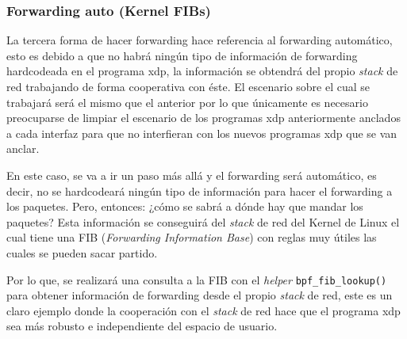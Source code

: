     
    



\subsubsection{Forwarding auto (Kernel FIBs)}

La tercera forma de hacer forwarding hace referencia al forwarding automático, esto es debido a que no habrá ningún tipo de información de forwarding hardcodeada en el programa \gls{xdp}, la información se obtendrá del propio \textit{stack} de red trabajando de forma cooperativa con éste. El escenario sobre el cual se trabajará será el mismo que el anterior por lo que únicamente es necesario preocuparse de limpiar el escenario de los programas \gls{xdp} anteriormente anclados a cada interfaz para que no interfieran con los nuevos programas \gls{xdp} que se van anclar.\\
\par
En este caso, se va a ir un paso más allá y el forwarding será automático, es decir, no se hardcodeará ningún tipo de información para hacer el forwarding a los paquetes. Pero, entonces: ¿cómo se sabrá a dónde hay que mandar los paquetes? Esta información se conseguirá del \textit{stack} de red del Kernel de Linux el cual tiene una FIB (\textit{Forwarding Information Base}) con reglas muy útiles las cuales se pueden sacar partido. \\
\par
Por lo que, se realizará una consulta a la FIB con el \textit{helper} \texttt{bpf\_fib\_lookup()} para obtener información de forwarding desde el propio \textit{stack} de red, este es un claro ejemplo donde la cooperación con el \textit{stack} de red hace que el programa \gls{xdp} sea más robusto e independiente del espacio de usuario.

